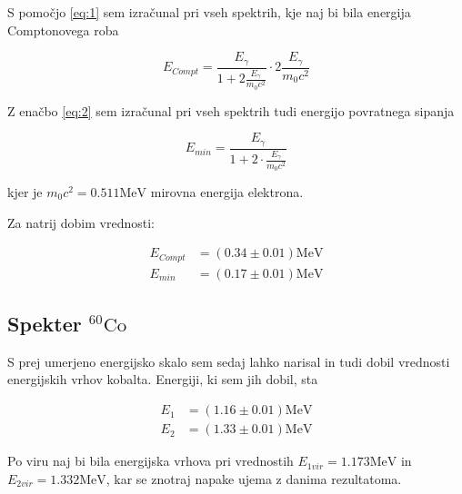 \documentclass[11pt]{article}
\begin{document}
S pomočjo \ref{eq:1} sem izračunal pri vseh spektrih, kje naj bi bila energija Comptonovega roba

\begin{equation}
\label{eq:1}
E_{Compt} = \frac{E_{\gamma}}{1 + 2 \frac{E_{\gamma}}{m_0 c ^2}} \cdot 2 \frac{E_{\gamma}}{m_0 c ^2}
\end{equation}

Z enačbo \ref{eq:2} sem izračunal pri vseh spektrih tudi energijo povratnega sipanja

\begin{equation}
\label{eq:2}
E_{min} = \frac{E_{\gamma}}{1 + 2 \cdot \frac{E_{\gamma}}{m_0 c ^2}}
\end{equation}

kjer je \(m_0 c ^2 = 0.511 \mathrm{MeV}\) mirovna energija elektrona.

Za natrij dobim vrednosti:

\begin{align*}
E_{Compt} &= (0.34 \pm 0.01) \mathrm{MeV} \\
E_{min} &= (0.17 \pm 0.01) \mathrm{MeV}
\end{align*}

\subsection{Spekter \(^{60} \mathrm{Co}\)}\label{sec:org51e535e}

S prej umerjeno energijsko skalo sem sedaj lahko narisal in tudi dobil vrednosti energijskih vrhov kobalta. Energiji, ki sem jih dobil, sta

\begin{align*}
  E_1 &= (1.16 \pm 0.01) \mathrm{MeV} \\
E_2 &= (1.33 \pm 0.01) \mathrm{MeV}
\end{align*}

Po viru \autocite{noauthor_cobalt-60_nodate} naj bi bila energijska vrhova pri vrednostih \(E_{1vir} = 1.173 \mathrm{MeV}\) in \(E_{2vir} = 1.332 \mathrm{MeV}\), kar se znotraj napake ujema z danima rezultatoma.
\end{document}
